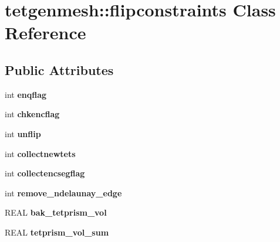 \hypertarget{classtetgenmesh_1_1flipconstraints}{}\section{tetgenmesh\+:\+:flipconstraints Class Reference}
\label{classtetgenmesh_1_1flipconstraints}
\subsection*{Public Attributes}
\begin{DoxyCompactItemize}
\item 
\mbox{\label{classtetgenmesh_1_1flipconstraints_ad16c3c6607dd1bedc7b580245ed34f56}} 
int {\bfseries enqflag}
\item 
\mbox{\label{classtetgenmesh_1_1flipconstraints_a5cb16eed34f6726058a81ff226f138f7}} 
int {\bfseries chkencflag}
\item 
\mbox{\label{classtetgenmesh_1_1flipconstraints_aaa71c48602e685babeca9669f8921b10}} 
int {\bfseries unflip}
\item 
\mbox{\label{classtetgenmesh_1_1flipconstraints_abddbd27770a07502372a20c9d0dd346d}} 
int {\bfseries collectnewtets}
\item 
\mbox{\label{classtetgenmesh_1_1flipconstraints_ae443417bfee2fe2d138ef19d1661668d}} 
int {\bfseries collectencsegflag}
\item 
\mbox{\label{classtetgenmesh_1_1flipconstraints_ab0ac97086329360ad119f215bd4fe02b}} 
int {\bfseries remove\+\_\+ndelaunay\+\_\+edge}
\item 
\mbox{\label{classtetgenmesh_1_1flipconstraints_abd1823bc4b973c204c9871630bc7e88b}} 
R\+E\+AL {\bfseries bak\+\_\+tetprism\+\_\+vol}
\item 
\mbox{\label{classtetgenmesh_1_1flipconstraints_a8bb8c96375bd68188384dd8cb34e0a28}} 
R\+E\+AL {\bfseries tetprism\+\_\+vol\+\_\+sum}

\end{DoxyCompactItemize}
